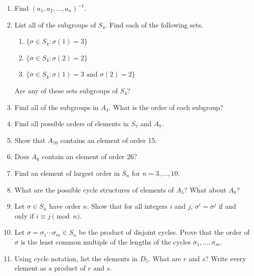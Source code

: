 {\begin{enumerate}
 
 
\bf \item \rm %
Find $(a_1, a_2, \ldots, a_n)^{-1}$.
 
\bf \item \rm %
List all of the subgroups of $S_4$. Find each of the following sets. 
\begin{enumerate}
 
 \bf \item \rm
$\{ \sigma \in S_4 : \sigma(1) = 3 \}$
 
 \bf \item \rm
$\{ \sigma \in S_4 : \sigma(2) = 2 \}$
 
 \bf \item \rm
$\{ \sigma \in S_4 : \sigma(1) = 3 \mbox{ and } \sigma(2) =
2 \}$
 
\end{enumerate}
Are any of these sets subgroups of $S_4$?
 
 
\bf \item \rm
Find all of the subgroups in $A_4$. What is the order of each
subgroup? 
 
 
\bf \item \rm
Find all possible orders of elements in $S_7$ and $A_7$.
 
 
\bf \item \rm
Show that $A_{10}$ contains an element of order 15.
 
 
\bf \item \rm
Does $A_8$ contain an element of order 26?
 
 
\bf \item \rm %
Find an element of largest order in $S_n$ for $n = 3, \ldots, 10$. 
 
 
\bf \item \rm
What are the possible cycle structures of elements of $A_5$? What
about $A_6$? 
 
 
\bf \item \rm
Let $\sigma \in S_n$ have order $n$. Show that for all integers $i$
and $j$, $\sigma^i = \sigma^j$ if and only if $i \equiv j \pmod{n}$. 
 
 
\bf \item \rm
Let $\sigma = \sigma_1 \cdots \sigma_m \in S_n$ be the product of
disjoint cycles. Prove that the order of $\sigma$ is the least common
multiple of the lengths of the cycles $\sigma_1, \ldots, \sigma_m$.
 
 
\bf \item \rm
Using cycle notation, list the elements in $D_5$.  What are $r$ and
$s$?  Write every element as a product of $r$ and $s$.
 

\end{enumerate}}
